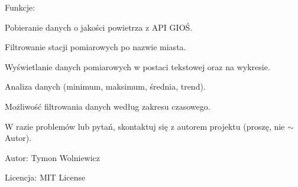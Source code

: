 Funkcje\+:
\begin{DoxyItemize}
\item Pobieranie danych o jakości powietrza z API GIOŚ.
\item Filtrowanie stacji pomiarowych po nazwie miasta.
\item Wyświetlanie danych pomiarowych w postaci tekstowej oraz na wykresie.
\item Analiza danych (minimum, maksimum, średnia, trend).
\item Możliwość filtrowania danych według zakresu czasowego.
\end{DoxyItemize}

W razie problemów lub pytań, skontaktuj się z autorem projektu (proszę, nie \texorpdfstring{$\sim$}{\string~}\+Autor).

Autor\+: Tymon Wolniewicz

Licencja\+: MIT License 